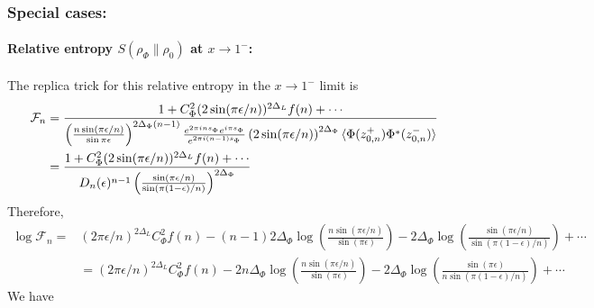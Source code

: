 \documentclass[11pt]{article}
\newcommand{\ep}{\epsilon}
\newcommand{\p}{\partial}
\newcommand{\nn}{\nonumber}
\newcommand{\lb}{\left(}
\newcommand{\rb}{\right)}
\newcommand{\NL}[1]{\textcolor{blue}{#1}}
\begin{document}
\subsubsection{Special cases:}
\paragraph{Relative entropy $S(\rho_\Phi\|\rho_0)$ at $x\to 1^-$:}
The replica trick for this relative entropy in the $x\to 1^-$ limit is
\begin{align}
  \mathcal{F}_n&=\frac{1+C_\Phi^2(2\sin(\pi \ep/n))^{2\Delta_L}f(n)+\cdots }{\lb \frac{n \sin (\pi \ep /n)}{\sin \pi \ep} \rb^{2\Delta_\Phi (n-1)}\frac{e^{2\pi i ns_\Phi}e^{i\pi s_\Phi}}{e^{2\pi i (n-1)s_\Phi}}
  \lb2\sin(\pi \ep/n)\rb^{2\Delta_\Phi}\braket{\Phi(z_{0,n}^+)\Phi^*(z_{0,n}^-)}} \nn \\
  &= \frac{1+C_\Phi^2(2\sin(\pi \ep/n))^{2\Delta_L}f(n)+\cdots }{D_n(\ep)^{n-1} \lb \frac{\sin(\pi \ep/n)}{\sin(\pi (1-\ep)/n)}\rb^{2\Delta_\Phi}
  }
\end{align}
Therefore,
\begin{align}
  \log\mathcal{F}_n=&(2\pi \ep/n)^{2\Delta_L}C_\Phi^2 f(n)-(n-1) 2\Delta_\Phi \log \lb \frac{n \sin (\pi \ep/n )}{\sin (\pi \ep)} \rb -2\Delta_\Phi\log\lb\frac{\sin(\pi \ep/n)}{\sin(\pi (1-\ep)/n)}\rb+\cdots\nn\\
  &=(2\pi \ep/n)^{2\Delta_L}C_\Phi^2 f(n)- 2n\Delta_\Phi \log \lb \frac{n \sin (\pi \ep/n )}{\sin (\pi \ep)} \rb -2\Delta_\Phi\log\lb\frac{\sin(\pi \ep)}{n\sin(\pi (1-\ep)/n)}\rb+\cdots
    \end{align}
We have
\end{document}
